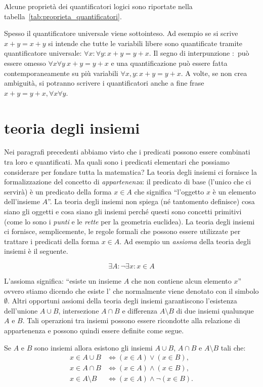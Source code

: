 Alcune proprietà dei quantificatori logici sono riportate
nella tabella~\ref{tab:proprieta_quantificatori}.

Spesso il quantificatore universale viene sottointeso.
Ad esempio se si scrive $x+y=x+y$
si intende che tutte le variabili libere sono quantificate 
tramite quantificatore universale: 
$\forall x\colon \forall y\colon x+y=y+x$.
Il segno di interpunzione $\colon$ può essere omesso
$\forall x \forall y\ x+y=y+x$
e una quantificazione può essere fatta contemporaneamente 
su più variabili $\forall x,y\colon x+y = y+x$.
A volte, se non crea ambiguità, si potranno scrivere 
i quantificatori anche a fine frase $x+y=y+x, \forall x\forall y$.

\section{teoria degli insiemi}

Nei paragrafi precedenti abbiamo visto che i predicati possono essere
combinati tra loro e quantificati.
Ma quali sono i predicati elementari che possiamo considerare per fondare 
tutta la matematica?
La teoria degli insiemi ci fornisce la formalizzazione del concetto
di \emph{appartenenza}: il predicato di base (l'unico che ci servirà) è
un predicato della forma $x \in A$ che significa ``l'oggetto $x$ è un elemento
dell'insieme $A$''.
La teoria degli insiemi non spiega (né tantomento definisce)
cosa siano gli oggetti e cosa siano gli insiemi perché questi sono concetti
primitivi (come lo sono i \emph{punti} e le \emph{rette} per la geometria euclidea).
La teoria degli insiemi ci fornisce, semplicemente, le regole formali che
possono essere utilizzate per trattare i predicati della forma $x\in A$.
Ad esempio un \emph{assioma} 
della teoria degli insiemi è il seguente.
\begin{axiom}
\[
  \exists A \colon \lnot \exists x\colon x \in A
\]
\end{axiom}
L'assioma significa: ``esiste un insieme $A$ che non contiene alcun elemento $x$''
ovvero stiamo dicendo che esiste l' che normalmente viene
denotato con il simbolo $\emptyset$.
Altri opportuni assiomi della teoria degli insiemi garantiscono l'esistenza
dell'unione $A\cup B$, intersezione $A\cap B$ e differenza $A\setminus B$
di due insiemi qualunque $A$ e $B$. Tali operazioni
tra insiemi possono essere ricondotte alla relazione di appartenenza
e possono quindi essere definite come segue.
\begin{axiom}
Se $A$ e $B$ sono insiemi allora esistono gli insiemi  
$A\cup B$, $A\cap B$ e $A\setminus B$ tali che:
\begin{align*}
    x \in A \cup B &\iff (x\in A) \lor (x\in B),\\
    x \in A \cap B &\iff (x\in A) \land (x\in B),\\
    x \in A \setminus B &\iff (x\in A) \land \lnot (x \in B).
\end{align*}
\end{axiom}

